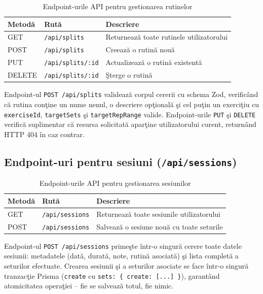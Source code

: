 \begin{table}[htbp]
\centering
\caption{Endpoint-urile API pentru gestionarea rutinelor}
\label{tab:api-splits}
\begin{tabular}{|l|l|l|}
\hline
\textbf{Metod\u a} & \textbf{Rut\u a} & \textbf{Descriere} \\
\hline
GET    & \texttt{/api/splits}     & Returneaz\u a toate rutinele utilizatorului \\
POST   & \texttt{/api/splits}     & Creeaz\u a o rutin\u a nou\u a \\
PUT    & \texttt{/api/splits/:id} & Actualizeaz\u a o rutin\u a existent\u a \\
DELETE & \texttt{/api/splits/:id} & \c Sterge o rutin\u a \\
\hline
\end{tabular}
\end{table}

Endpoint-ul \texttt{POST /api/splits} valideaz\u a corpul cererii
cu schema Zod, verific\^ and c\u a rutina con\c tine un nume
nenul, o descriere op\c tional\u a \c si cel pu\c tin un exerci\c tiu
cu \texttt{exerciseId}, \texttt{targetSets} \c si
\texttt{targetRepRange} valide. Endpoint-urile
\texttt{PUT} \c si \texttt{DELETE} verific\u a suplimentar c\u a
resursa solicitat\u a apar\c tine utilizatorului curent,
return\^ and HTTP 404 \^ in caz contrar.

\subsection{Endpoint-uri pentru sesiuni (\texttt{/api/sessions})}

\begin{table}[htbp]
\centering
\caption{Endpoint-urile API pentru gestionarea sesiunilor}
\label{tab:api-sessions}
\begin{tabular}{|l|l|l|}
\hline
\textbf{Metod\u a} & \textbf{Rut\u a} & \textbf{Descriere} \\
\hline
GET  & \texttt{/api/sessions} & Returneaz\u a toate sesiunile utilizatorului \\
POST & \texttt{/api/sessions} & Salveaz\u a o sesiune nou\u a cu toate seturile \\
\hline
\end{tabular}
\end{table}

Endpoint-ul \texttt{POST /api/sessions} prime\c ste \^ intr-o
singur\u a cerere toate datele sesiunii: metadatele
(dat\u a, durat\u a, note, rutin\u a asociat\u a) \c si lista
complet\u a a seturilor efectuate. Crearea sesiunii \c si
a seturilor asociate se face \^ intr-o singur\u a tranzac\c tie
Prisma (\texttt{create} cu \texttt{sets: \{ create: [...] \}}),
garant\^ and atomicitatea opera\c tiei -- fie se salveaz\u a
totul, fie nimic.

